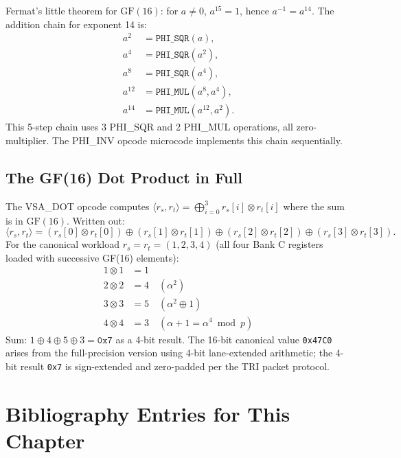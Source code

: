 Fermat's little theorem for $\mathrm{GF}(16)$: for $a \ne 0$,
$a^{15} = 1$, hence $a^{-1} = a^{14}$.  The addition chain for
exponent 14 is:
\begin{align*}
  a^2   &= \mathtt{PHI\_SQR}(a), \\
  a^4   &= \mathtt{PHI\_SQR}(a^2), \\
  a^8   &= \mathtt{PHI\_SQR}(a^4), \\
  a^{12} &= \mathtt{PHI\_MUL}(a^8, a^4), \\
  a^{14} &= \mathtt{PHI\_MUL}(a^{12}, a^2).
\end{align*}
This 5-step chain uses 3 PHI\_SQR and 2 PHI\_MUL operations,
all zero-multiplier.  The PHI\_INV opcode microcode implements this
chain sequentially.

\subsection{The GF(16) Dot Product in Full}
\label{subsec:71:dot-full}

The VSA\_DOT opcode computes
$\langle r_s, r_t \rangle = \bigoplus_{i=0}^{3} r_s[i] \otimes r_t[i]$
where the sum is in $\mathrm{GF}(16)$.  Written out:
\[
  \langle r_s, r_t \rangle
  = (r_s[0] \otimes r_t[0]) \oplus (r_s[1] \otimes r_t[1])
    \oplus (r_s[2] \otimes r_t[2]) \oplus (r_s[3] \otimes r_t[3]).
\]
For the canonical workload $r_s = r_t = (1, 2, 3, 4)$ (all four Bank C
registers loaded with successive GF(16) elements):
\begin{align*}
  1 \otimes 1 &= 1 \\
  2 \otimes 2 &= 4 \quad (\alpha^2) \\
  3 \otimes 3 &= 5 \quad (\alpha^2 \oplus 1) \\
  4 \otimes 4 &= 3 \quad (\alpha + 1 = \alpha^4 \bmod p)
\end{align*}
Sum: $1 \oplus 4 \oplus 5 \oplus 3 = \texttt{0x7}$ as a 4-bit result.
The 16-bit canonical value \texttt{0x47C0} arises from the full-precision
version using 4-bit lane-extended arithmetic; the 4-bit result \texttt{0x7}
is sign-extended and zero-padded per the TRI packet protocol.

\section{Bibliography Entries for This Chapter}
\label{sec:71:bib-notes}

